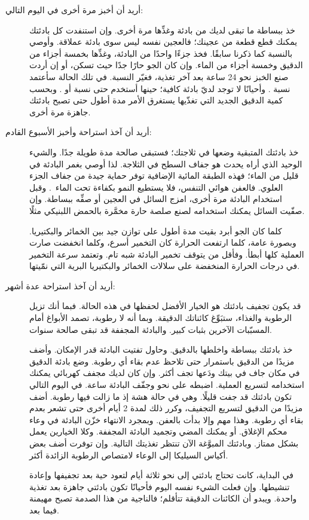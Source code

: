 \begin{description}
\item[أريد أن أخبز مرة أخرى في اليوم التالي:]
خذ ببساطة ما تبقى لديك من بادئة وغذِّها مرة أخرى. وإن استنفدت كل بادئتك يمكنك قطع قطعة من عجينك؛ فالعجين نفسه ليس سوى بادئة عملاقة. وأوصي بالنسبة  كما ذكرنا سابقًا. فخذ جزءًا واحدًا من البادئة، وغذِّها بخمسة أجزاء من الدقيق وخمسة أجزاء من الماء. وإن كان الجو حارًا جدًا حيث تسكن، أو إن أردت صنع الخبز نحو 24 ساعة بعد آخر تغذية، فغيّر النسبة. في تلك الحالة سأعتمد نسبة . وأحيانًا لا توجد لديّ بادئة كافية؛ حينها أستخدم حتى نسبة  أو . وبحسب كمية الدقيق الجديد التي تغذّيها يستغرق الأمر مدة أطول حتى تصبح بادئتك جاهزة مرة أخرى.

\item[أريد أن آخذ استراحة وأخبز الأسبوع القادم:]
خذ بادئتك المتبقية وضعها في ثلاجتك؛ فستبقى صالحة مدة طويلة جدًا. والشيء الوحيد الذي أراه يحدث هو جفاف السطح في الثلاجة. لذا أوصي بغمر البادئة في قليل من الماء؛ فهذه الطبقة المائية الإضافية توفر حماية جيدة من جفاف الجزء العلوي. فالعفن هوائي التنفس، فلا يستطيع النمو بكفاءة تحت الماء~\cite{mold+anaerobic}. وقبل استخدام البادئة مرة أخرى، امزج السائل في العجين أو صفِّه ببساطة. وإن صفّيت السائل يمكنك استخدامه لصنع صلصة حارة مخمَّرة بالحمض اللبنيكي مثلًا.

كلما كان الجو أبرد بقيت مدة أطول على توازن جيد بين الخمائر والبكتيريا. وبصورة عامة، كلما ارتفعت الحرارة كان التخمير أسرع، وكلما انخفضت صارت العملية كلها أبطأ. وفأقل من  يتوقف تخمير البادئة شبه تام. وتعتمد سرعة التخمير في درجات الحرارة المنخفضة على سلالات الخمائر والبكتيريا البرية التي نمّيتها.

\item[أريد أن آخذ استراحة عدة أشهر:]
قد يكون تجفيف بادئتك هو الخيار الأفضل لحفظها في هذه الحالة. فبما أنك تزيل الرطوبة والغذاء، ستبَوِّغ كائناتك الدقيقة. وبما أنه لا رطوبة، تصمد الأبواغ أمام المسبّبات الآخرين بثبات كبير. والبادئة المجففة قد تبقى صالحة سنوات.

خذ بادئتك ببساطة واخلطها بالدقيق. وحاول تفتيت البادئة قدر الإمكان. وأضف مزيدًا من الدقيق باستمرار حتى تلاحظ عدم بقاء أي رطوبة. وضع بادئة الدقيق في مكان جاف في بيتك ودَعها تجف أكثر. وإن كان لديك مجفف كهربائي يمكنك استخدامه لتسريع العملية. اضبطه على نحو  وجفّف البادئة  ساعة. في اليوم التالي تكون بادئتك قد جفت قليلًا. وهي في حالة هشة إذ ما زالت فيها رطوبة. أضف مزيدًا من الدقيق لتسريع التجفيف، وكرر ذلك لمدة \num{2} أيام أخرى حتى تشعر بعدم بقاء أي رطوبة. وهذا مهم وإلا بدأت بالعفن. وبمجرد الانتهاء خزّن البادئة في وعاء محكم الإغلاق. أو يمكنك المضي وتجميد البادئة المجففة. وكلا الخيارين يعمل بشكل ممتاز. وبادئتك المبوَّغة الآن تنتظر تغذيتك التالية. وإن توفرت أضف بعض أكياس السيليكا إلى الوعاء لامتصاص الرطوبة الزائدة أكثر.

في البداية، كانت تحتاج بادئتي إلى نحو ثلاثة أيام لتعود حية بعد تجفيفها وإعادة تنشيطها. وإن فعلت الشيء نفسه اليوم فأحيانًا تكون بادئتي جاهزة بعد تغذية واحدة. ويبدو أن الكائنات الدقيقة تتأقلم؛ فالناجية من هذا الصدمة تصبح مهيمنة فيما بعد.
\end{description}

